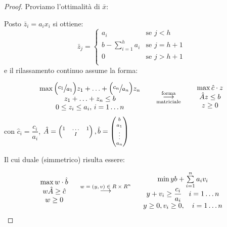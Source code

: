 \documentclass[a4paper,11pt]{book}
\theoremstyle{break}
\begin{document}
\begin{proof} \footnotesize Proviamo l'ottimalità di $\bar x$:\smallskip

Posto $\bar z_i = a_ix_i$ si ottiene: \[\bar z_j = \begin{cases}
   a_i &\text{se }j<h\\
   b- \sum_{i = 1}^h a_i&\text{se }j=h+1\\
   0 &\text{se }j>h+1\\
  \end{cases}\]
 e il rilassamento continuo assume la forma:

\[\begin{matrix}
 \max \large\big(\large\sfrac{c_1}{a_1}\big) z_1 + \hdots + \big(\large\sfrac{c_n}{a_n}\big) z_n\\
 z_1 + \hdots + z_n \leq b\\
 0 \leq z_i \leq a_i, \, i = 1 \hdots n    \end{matrix} \quad\quad \overset{\text{\scriptsize forma}}{\underset{\text{\scriptsize matriciale}}{\longrightarrow}} \quad\quad   \begin{matrix}
 \max \hat c \cdot z\\
 \hat A z \leq b\\
 z \geq 0    \end{matrix}\]
con $\hat c_i = \dfrac{c_i}{a_i}$, $\hat A = \scriptsize\begin{pmatrix}
                                            1 &\hdots &1\\
                                            &I&
                                           \end{pmatrix}, \hat b = \begin{pmatrix}
                                                                        b\\a_1\\\vdots\\a_n

                                                                   \end{pmatrix}
$\smallskip

Il cui duale (simmetrico) risulta essere:

\[\begin{matrix}
    \max w \cdot \hat b\\w\hat A \geq \hat c\\w \geq 0
  \end{matrix}\hspace{.5cm}\overset{\text{\scriptsize $w = (y, v) \in R \times R^n$}}{\longrightarrow}\hspace{.5cm} \begin{matrix}
    \min yb + \sum\limits_{i = 1}^n a_i v_i \\ y + v_i \geq \dfrac{c_i}{a_i} \quad i = 1 \hdots n \\y \geq 0, v_i \geq 0, \quad i = 1 \hdots n
  \end{matrix}
\]


\end{proof}
\end{document}
